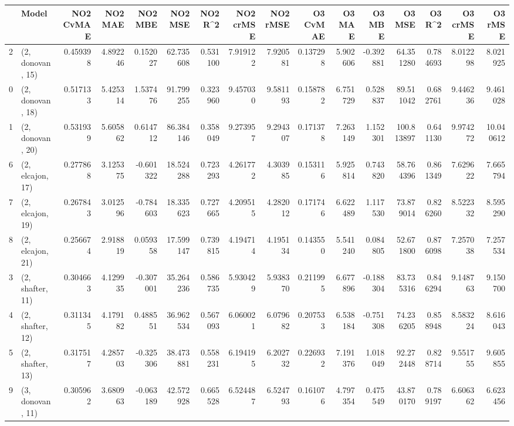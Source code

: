 \begin{tabular}{llrrrrrrrrrrrrrr}
\toprule
{} &             Model &  NO2 CvMAE &   NO2 MAE &   NO2 MBE &    NO2 MSE &   NO2 R\textasciicircum2 &  NO2 crMSE &  NO2 rMSE &  O3 CvMAE &     O3 MAE &     O3 MBE &      O3 MSE &    O3 R\textasciicircum2 &   O3 crMSE &    O3 rMSE \\
\midrule
2  &  (2, donovan, 15) &   0.459398 &  4.892246 &  0.152027 &  62.735608 &  0.531100 &   7.919122 &  7.920581 &  0.137298 &   5.902606 &  -0.392881 &   64.351280 &  0.784693 &   8.012298 &   8.021925 \\
0  &  (2, donovan, 18) &   0.517133 &  5.425314 &  1.537476 &  91.799255 &  0.323960 &   9.457030 &  9.581193 &  0.158782 &   6.751729 &   0.528837 &   89.511042 &  0.682761 &   9.446236 &   9.461028 \\
1  &  (2, donovan, 20) &   0.531939 &  5.605862 &  0.614712 &  86.384146 &  0.358049 &   9.273957 &  9.294307 &  0.171378 &   7.263149 &   1.152301 &  100.813897 &  0.641130 &   9.974272 &  10.040612 \\
6  &  (2, elcajon, 17) &   0.277868 &  3.125375 & -0.601322 &  18.524288 &  0.723293 &   4.261772 &  4.303985 &  0.153116 &   5.925814 &   0.743820 &   58.764396 &  0.861349 &   7.629622 &   7.665794 \\
7  &  (2, elcajon, 19) &   0.267843 &  3.012596 & -0.784603 &  18.335623 &  0.727665 &   4.209515 &  4.282012 &  0.171746 &   6.622489 &   1.117530 &   73.879014 &  0.826260 &   8.522332 &   8.595290 \\
8  &  (2, elcajon, 21) &   0.256674 &  2.918819 &  0.059358 &  17.599147 &  0.739815 &   4.194714 &  4.195134 &  0.143550 &   5.541240 &   0.084805 &   52.671800 &  0.876098 &   7.257038 &   7.257534 \\
3  &  (2, shafter, 11) &   0.304663 &  4.129935 & -0.307001 &  35.264236 &  0.586735 &   5.930429 &  5.938370 &  0.211995 &   6.677896 &  -0.188304 &   83.735316 &  0.846294 &   9.148763 &   9.150700 \\
4  &  (2, shafter, 12) &   0.311345 &  4.179182 &  0.488551 &  36.962534 &  0.567093 &   6.060021 &  6.079682 &  0.207533 &   6.538184 &  -0.751308 &   74.236205 &  0.858948 &   8.583224 &   8.616043 \\
5  &  (2, shafter, 13) &   0.317517 &  4.285703 & -0.325306 &  38.473881 &  0.558231 &   6.194195 &  6.202732 &  0.226932 &   7.191376 &   1.018049 &   92.272448 &  0.828714 &   9.551755 &   9.605855 \\
9  &  (3, donovan, 11) &   0.305962 &  3.680963 & -0.063189 &  42.572928 &  0.665528 &   6.524487 &  6.524793 &  0.161076 &   4.797354 &   0.475549 &   43.870170 &  0.789197 &   6.606362 &   6.623456 \\

\end{tabular}

